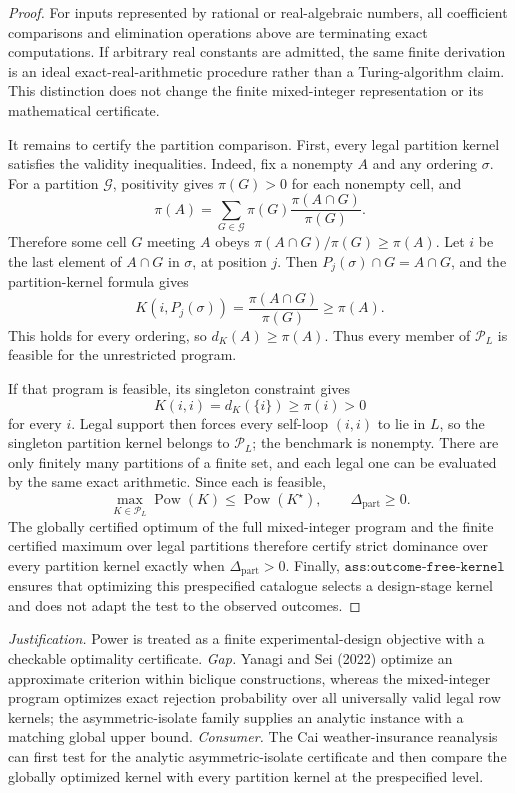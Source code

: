 \documentclass{article}
\begin{document}
\begin{proof}
For inputs represented by rational or real-algebraic numbers, all coefficient comparisons and elimination operations above are terminating exact computations.  If arbitrary real constants are admitted, the same finite derivation is an ideal exact-real-arithmetic procedure rather than a Turing-algorithm claim.  This distinction does not change the finite mixed-integer representation or its mathematical certificate.

It remains to certify the partition comparison.  First, every legal partition kernel satisfies the validity inequalities.  Indeed, fix a nonempty \(A\) and any ordering \(\sigma\).  For a partition \(\mathcal G\), positivity gives \(\pi(G)>0\) for each nonempty cell, and
\[
 \pi(A)=\sum_{G\in\mathcal G}\pi(G)\frac{\pi(A\cap G)}{\pi(G)}.
\]
Therefore some cell \(G\) meeting \(A\) obeys \(\pi(A\cap G)/\pi(G)\geq\pi(A)\).  Let \(i\) be the last element of \(A\cap G\) in \(\sigma\), at position \(j\).  Then \(P_j(\sigma)\cap G=A\cap G\), and the partition-kernel formula gives
\[
 K(i,P_j(\sigma))=\frac{\pi(A\cap G)}{\pi(G)}\geq\pi(A).
\]
This holds for every ordering, so \(d_K(A)\geq\pi(A)\).  Thus every member of \(\mathcal P_L\) is feasible for the unrestricted program.

If that program is feasible, its singleton constraint gives
\[
 K(i,i)=d_K(\{i\})\geq\pi(i)>0
\]
for every \(i\).  Legal support then forces every self-loop \((i,i)\) to lie in \(L\), so the singleton partition kernel belongs to \(\mathcal P_L\); the benchmark is nonempty.  There are only finitely many partitions of a finite set, and each legal one can be evaluated by the same exact arithmetic.  Since each is feasible,
\[
 \max_{K\in\mathcal P_L}\operatorname{Pow}(K)
 \leq \operatorname{Pow}(K^\star),
 \qquad
 \Delta_{\mathrm{part}}\geq0.
\]
The globally certified optimum of the full mixed-integer program and the finite certified maximum over legal partitions therefore certify strict dominance over every partition kernel exactly when \(\Delta_{\mathrm{part}}>0\).  Finally, \(\texttt{ass:outcome-free-kernel}\) ensures that optimizing this prespecified catalogue selects a design-stage kernel and does not adapt the test to the observed outcomes.
\end{proof}
\par\smallskip\noindent \textit{Justification.} Power is treated as a finite experimental-design objective with a checkable optimality certificate. \textit{Gap.} Yanagi and Sei (2022) optimize an approximate criterion within biclique constructions, whereas the mixed-integer program optimizes exact rejection probability over all universally valid legal row kernels; the asymmetric-isolate family supplies an analytic instance with a matching global upper bound. \textit{Consumer.} The Cai weather-insurance reanalysis can first test for the analytic asymmetric-isolate certificate and then compare the globally optimized kernel with every partition kernel at the prespecified level.
\end{document}

